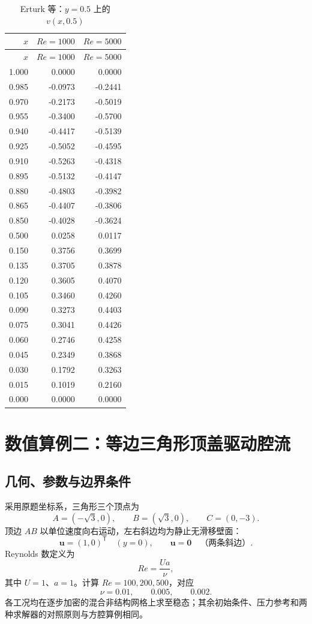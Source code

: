 \documentclass[UTF8,a4paper,11pt]{ctexart}
\newcommand{\vect}[1]{\bm{#1}}
\begin{document}
\begin{longtable}{r|rr}
\caption{Erturk 等\cite{Erturk2005}：\(y=0.5\) 上的 \(v(x,0.5)\)}
\label{tab:erturk-v}\\
\toprule
\(x\) & \(Re=1000\) & \(Re=5000\) \\
\midrule
\endfirsthead
\toprule
\(x\) & \(Re=1000\) & \(Re=5000\) \\
\midrule
\endhead
1.000 & 0.0000 & 0.0000 \\
0.985 & -0.0973 & -0.2441 \\
0.970 & -0.2173 & -0.5019 \\
0.955 & -0.3400 & -0.5700 \\
0.940 & -0.4417 & -0.5139 \\
0.925 & -0.5052 & -0.4595 \\
0.910 & -0.5263 & -0.4318 \\
0.895 & -0.5132 & -0.4147 \\
0.880 & -0.4803 & -0.3982 \\
0.865 & -0.4407 & -0.3806 \\
0.850 & -0.4028 & -0.3624 \\
0.500 & 0.0258 & 0.0117 \\
0.150 & 0.3756 & 0.3699 \\
0.135 & 0.3705 & 0.3878 \\
0.120 & 0.3605 & 0.4070 \\
0.105 & 0.3460 & 0.4260 \\
0.090 & 0.3273 & 0.4403 \\
0.075 & 0.3041 & 0.4426 \\
0.060 & 0.2746 & 0.4258 \\
0.045 & 0.2349 & 0.3868 \\
0.030 & 0.1792 & 0.3263 \\
0.015 & 0.1019 & 0.2160 \\
0.000 & 0.0000 & 0.0000 \\
\bottomrule
\end{longtable}

\section{数值算例二：等边三角形顶盖驱动腔流}

\subsection{几何、参数与边界条件}

采用原题坐标系，三角形三个顶点为
\[
  A=(-\sqrt{3},0),\qquad B=(\sqrt{3},0),\qquad C=(0,-3).
\]
顶边 \(AB\) 以单位速度向右运动，左右斜边均为静止无滑移壁面：
\[
  \vect{u}=(1,0)^{\mathsf T}\quad(y=0),\qquad
  \vect{u}=\vect{0}\quad\text{（两条斜边）}.
\]
Reynolds 数定义为
\[
  Re=\frac{Ua}{\nu},
\]
其中 \(U=1\)、\(a=1\)。计算 \(Re=100,200,500\)，对应
\[
  \nu=0.01,\qquad 0.005,
  \qquad 0.002.
\]
各工况均在逐步加密的混合非结构网格上求至稳态；其余初始条件、压力参考和两种求解器的对照原则与方腔算例相同。
\end{document}
